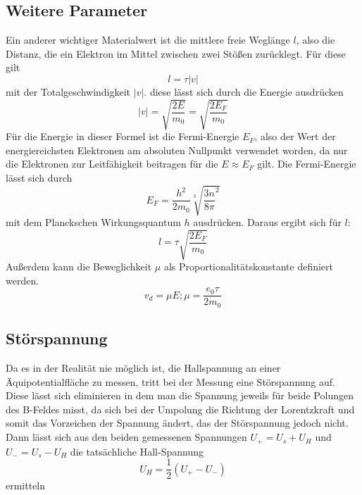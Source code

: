 \subsection{Weitere Parameter}
Ein anderer wichtiger Materialwert ist die mittlere freie Weglänge $l$, also die Distanz, die ein Elektron im Mittel zwischen zwei Stößen zurücklegt. Für diese gilt
\begin{equation}
l=\tau \vert v \vert
\end{equation}  
mit der Totalgeschwindigkeit $\vert v \vert$. diese lässt sich durch die Energie ausdrücken
\begin{equation}
\vert v \vert=\sqrt{\frac{2E}{m_0}}=\sqrt{\frac{2E_F}{m_0}}
\end{equation}
Für die Energie in dieser Formel ist die Fermi-Energie $E_F$, also der Wert der energiereichsten Elektronen am absoluten Nullpunkt verwendet worden, da nur die Elektronen zur Leitfähigkeit beitragen für die $E\approx E_F$ gilt. Die Fermi-Energie lässt sich durch
\begin{equation}
E_F=\frac{h^2}{2m_0}\sqrt[3]{\frac{3n}{8\pi}^2}
\end{equation}
mit dem Planckschen Wirkungsquantum $h$ ausdrücken. Daraus ergibt sich für $l$:
\begin{equation}
   l=\tau\sqrt{\frac{2E_F}{m_0}}
\end{equation}
Außerdem kann die Beweglichkeit $\mu$ als Proportionalitätskonstante definiert werden.
\begin{equation}
v_d=\mu E;\mu=\frac{e_0\tau}{2m_0}
\end{equation}
\subsection{Störspannung}
Da es in der Realität nie möglich ist, die Hallspannung an einer Äquipotentialfläche zu messen, tritt bei der Messung eine Störspannung auf. Diese lässt sich eliminieren in dem man die Spannung jeweils für beide Polungen des B-Feldes misst, da sich
bei der Umpolung die Richtung der Lorentzkraft und somit das Vorzeichen der Spannung ändert, das der Störspannung jedoch nicht. Dann lässt sich aus den beiden gemessenen Spannungen $U_+=U_s+U_H$ und $U_-=U_s-U_H$ die tatsächliche Hall-Spannung
\begin{equation}
U_H=\frac{1}{2}(U_+-U_-)
\end{equation}
 ermitteln